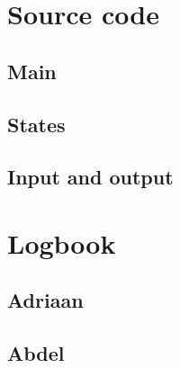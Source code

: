 \begin{appendices}

\begin{comment}
\chapter{Reflection} \label{a:reflection}
    \section{Adriaan}
    
\end{comment}

\chapter{Source code} \label{a:sourceCode}
	\section{Main}
        
	\section{States}
        
        
        
	\section{Input and output}
        
        


\chapter{Logbook} \label{a:logbook}
    \section{Adriaan}
     \newpage

    \section{Abdel}
     \newpage


\end{appendices}

